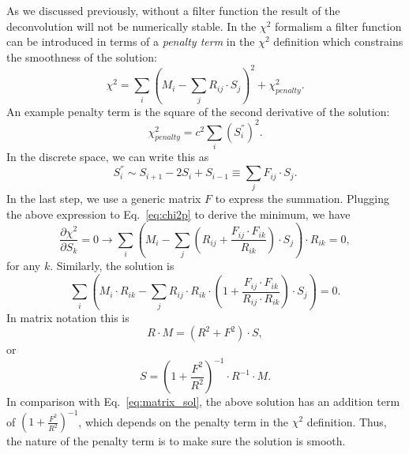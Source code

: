 As we discussed previously, without a filter function the result of
the deconvolution will not be numerically stable.
In the $\chi^2$ formalism a filter function can be introduced in terms
of a \textit{penalty term} in the $\chi^2$ definition which constrains the
smoothness of the solution:
\begin{equation}\label{eq:chi2p}
\chi^2 = \sum_i \left( M_i - \sum_j R_{ij} \cdot S_j \right)^2 + 
\chi^2_{penalty}.
\end{equation} 
An example penalty term is the square of the second derivative of the 
solution:
\begin{equation}
\chi^2_{penalty} = c^2 \sum_i \left( S_i^{''}\right)^2.
\end{equation}
In the discrete space, we can write this as
\begin{equation}
S_i^{''} \sim S_{i+1} - 2S_i + S_{i-1} \equiv \sum_{j} F_{ij} \cdot S_{j}.
\end{equation}
In the last step, we use a generic matrix $F$ to express the summation. 
Plugging the above expression to Eq.~\ref{eq:chi2p} to derive the minimum, 
we have 
\begin{equation}
\frac{\partial \chi^2}{\partial S_k} = 0 \rightarrow 
\sum_i \left( M_i - \sum_j \left( R_{ij} + \frac{F_{ij} \cdot F_{ik}}{R_{ik}} \right) \cdot S_j \right) \cdot R_{ik} = 0,
\end{equation}
for any $k$. Similarly, the solution is 
\begin{equation}
\sum_i \left( M_i\cdot R_{ik} - \sum_j R_{ij} \cdot R_{ik} \cdot \left (
1 + \frac{F_{ij} \cdot F_{ik}}{R_{ij} \cdot R_{ik}} \right) \cdot S_j \right) = 0.
\end{equation}
In  matrix notation this is
\begin{equation}
R\cdot M = \left( R^2 + F^2 \right) \cdot S,
\end{equation}
or 
\begin{equation}\label{eq:filter_sol}
S = \left( 1 + \frac{F^2}{R^2} \right)^{-1} \cdot R^{-1} \cdot M.
\end{equation}
In comparison with Eq.~\ref{eq:matrix_sol}, the above 
solution has an addition term of $\left( 1 + \frac{F^2}{R^2} \right)^{-1}$,
which depends on the penalty term in the $\chi^2$ definition. 
Thus, the nature of the penalty term is to make sure the solution is 
smooth. 

